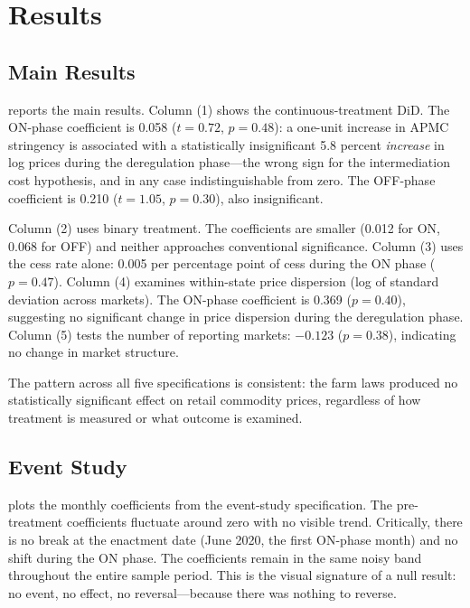 \documentclass[12pt]{article}
\begin{document}
\section{Results}

\subsection{Main Results}

 reports the main results. Column (1) shows the continuous-treatment DiD. The ON-phase coefficient is 0.058 ($t = 0.72$, $p = 0.48$): a one-unit increase in APMC stringency is associated with a statistically insignificant 5.8 percent \emph{increase} in log prices during the deregulation phase---the wrong sign for the intermediation cost hypothesis, and in any case indistinguishable from zero. The OFF-phase coefficient is 0.210 ($t = 1.05$, $p = 0.30$), also insignificant.

Column (2) uses binary treatment. The coefficients are smaller (0.012 for ON, 0.068 for OFF) and neither approaches conventional significance. Column (3) uses the cess rate alone: 0.005 per percentage point of cess during the ON phase ($p = 0.47$). Column (4) examines within-state price dispersion (log of standard deviation across markets). The ON-phase coefficient is 0.369 ($p = 0.40$), suggesting no significant change in price dispersion during the deregulation phase. Column (5) tests the number of reporting markets: $-0.123$ ($p = 0.38$), indicating no change in market structure.

The pattern across all five specifications is consistent: the farm laws produced no statistically significant effect on retail commodity prices, regardless of how treatment is measured or what outcome is examined.



\subsection{Event Study}

 plots the monthly coefficients from the event-study specification. The pre-treatment coefficients fluctuate around zero with no visible trend. Critically, there is no break at the enactment date (June 2020, the first ON-phase month) and no shift during the ON phase. The coefficients remain in the same noisy band throughout the entire sample period. This is the visual signature of a null result: no event, no effect, no reversal---because there was nothing to reverse.
\end{document}

